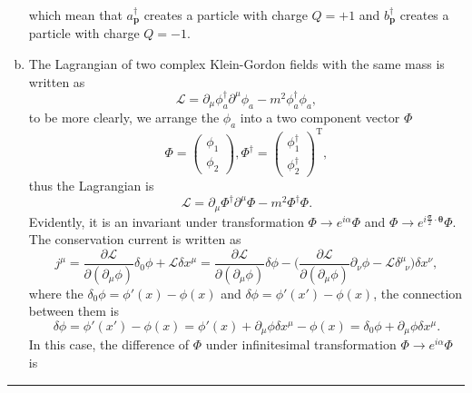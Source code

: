 \documentclass[12pt]{report}
\numberwithin{problemname}{chapter}
\newenvironment{solution}{\vspace{1em}\par\noindent{\large\textbf{\textsc{Solution}}}\par}{\vspace{1em}\hrule}
\begin{document}
\begin{solution}
\begin{enumerate}[(a)]
\begin{equation}
    \end{equation}
    which mean that $a^{\dagger}_{\mathbf{p}}$ creates a particle with charge $Q=+1$ and $b^{\dagger}_{\mathbf{p}}$ creates a particle with charge $Q=-1$.
    \item The Lagrangian of two complex Klein-Gordon fields with the same mass is written as
    \begin{equation}
        \mathcal{L}=\partial_{\mu}\phi^{\dagger}_{a}\partial^{\mu}\phi_{a}-m^2\phi^{\dagger}_{a}\phi_{a},
    \end{equation}
    to be more clearly, we arrange the $\phi_{a}$ into a two component vector $\Phi$
    \begin{equation}
        \Phi=
        \begin{pmatrix}
            \phi_{1} \\
            \phi_{2}
        \end{pmatrix},
        \Phi^{\dagger}=
        \begin{pmatrix}
            \phi^{\dagger}_{1} \\
            \phi^{\dagger}_{2}
        \end{pmatrix}^{\text{T}},
    \end{equation}
    thus the Lagrangian is
    \begin{equation}
        \mathcal{L}=\partial_{\mu}\Phi^{\dagger}\partial^{\mu}\Phi-m^2\Phi^{\dagger}\Phi.
    \end{equation}
    Evidently, it is an invariant under transformation $\Phi\rightarrow e^{i\alpha}\Phi$ and $\Phi\rightarrow e^{i\frac{\bm{\sigma}}{2}\cdot\bm{\theta}}\Phi$. The conservation current is written as 
    \begin{equation}
        j^{\mu}=\frac{\partial\mathcal{L}}{\partial(\partial_{\mu}\phi)}\delta_{0}\phi+\mathcal{L}\delta x^{\mu}=\frac{\partial\mathcal{L}}{\partial(\partial_{\mu}\phi)}\delta\phi-\Big(\frac{\partial\mathcal{L}}{\partial(\partial_{\mu}\phi)}\partial_{\nu}\phi-\mathcal{L}\delta^{\mu}_{\enspace\nu}\Big)\delta x^{\nu}, \label{Eq:NoetherCurrent}
    \end{equation}
    where the $\delta_{0}\phi=\phi'(x)-\phi(x)$ and $\delta\phi=\phi'(x')-\phi(x)$, the connection between them is
    \begin{equation}
        \delta\phi=\phi'(x')-\phi(x)=\phi'(x)+\partial_{\mu}\phi\delta x^{\mu}-\phi(x)=\delta_{0}\phi+\partial_{\mu}\phi\delta x^{\mu}.
    \end{equation}
    In this case, the difference of $\Phi$ under infinitesimal transformation $\Phi\rightarrow e^{i\alpha}\Phi$ is

\end{enumerate}
\end{solution}
\end{document}

